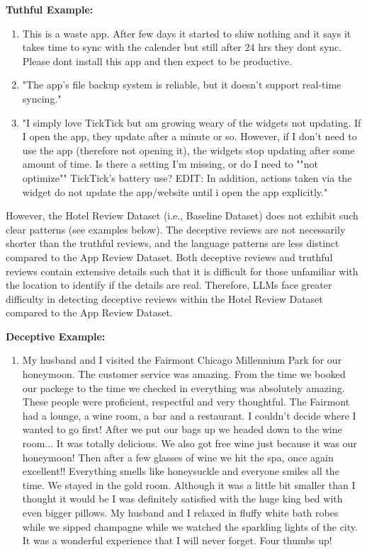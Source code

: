 \documentclass[sigconf, nonacm]{acmart}
\newenvironment{example}
{\begin{mdframed}[
    linecolor=exampleborder,
    linewidth=0.5pt,
    backgroundcolor=examplecolor,
    topline=false,
    bottomline=false,
    leftline=true,
    rightline=false,
    innertopmargin=2pt,
    innerbottommargin=2pt,
    innerleftmargin=5pt,
    innerrightmargin=5pt,
    skipabove=10pt,
    skipbelow=10pt
]}
{\end{mdframed}}
\theoremstyle{definition}
\begin{document}
\begin{example}
  \textbf{Tuthful Example:}
  \begin{enumerate}
    \item This is a waste app. After few days it started to shiw nothing and it says it takes time to sync with the calender but still after 24 hrs they dont sync. Please dont install this app and then expect to be productive.
    \item "The app’s file backup system is reliable, but it doesn’t support real-time syncing."
    \item "I simply love TickTick but am growing weary of the widgets not updating. If I open the app, they update after a minute or so. However, if I don't need to use the app (therefore not opening it), the widgets stop updating after some amount of time. Is there a setting I'm missing, or do I need to ""not optimize"" TickTick's battery use? EDIT: In addition, actions taken via the widget do not update the app/website until i open the app explicitly."
  \end{enumerate}
\end{example}

However, the Hotel Review Dataset (i.e., Baseline Dataset) does not exhibit such clear patterns (see examples below). The deceptive reviews are not necessarily shorter than the truthful reviews, and the language patterns are less distinct compared to the App Review Dataset. Both deceptive reviews and truthful reviews contain extensive details such that it is difficult for those unfamiliar with the location to identify if the details are real. Therefore, LLMs face greater difficulty in detecting deceptive reviews within the Hotel Review Dataset compared to the App Review Dataset.

\begin{example}
  \textbf{Deceptive Example:}
  \begin{enumerate}
    \item My husband and I visited the Fairmont Chicago Millennium Park for our honeymoon. The customer service was amazing. From the time we booked our packege to the time we checked in everything was absolutely amazing. These people were proficient, respectful and very thoughtful. The Fairmont had a lounge, a wine room, a bar and a restaurant. I couldn't decide where I wanted to go first! After we put our bags up we headed down to the wine room... It was totally delicious. We also got free wine just because it was our honeymoon! Then after a few glasses of wine we hit the spa, once again excellent!! Everything smells like honeysuckle and everyone smiles all the time. We stayed in the gold room. Although it was a little bit smaller than I thought it would be I was definitely satisfied with the huge king bed with even bigger pillows. My husband and I relaxed in fluffy white bath robes while we sipped champagne while we watched the sparkling lights of the city. It was a wonderful experience that I will never forget. Four thumbs up!
  \end{enumerate}
\end{example}
\end{document}
